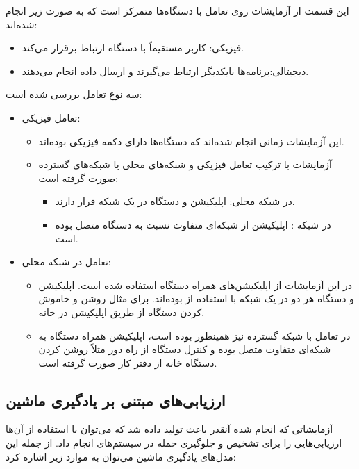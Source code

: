 این قسمت از آزمایشات روی تعامل با دستگاه‌ها متمرکز است که به صورت زیر انجام
شده‌اند:

\begin{itemize}
    \item فیزیکی: کاربر مستقیماً با دستگاه ارتباط برقرار می‌کند.
    \item دیجیتالی:‌برنامه‌ها بایکدیگر ارتباط می‌گیرند و ارسال داده انجام
    می‌دهند.
\end{itemize}

سه نوع تعامل بررسی شده است:

\begin{itemize}
    \item تعامل فیزیکی:
    \begin{itemize}
        \item این آزمایشات زمانی انجام شده‌اند که دستگاه‌ها دارای دکمه فیزیکی
        بوده‌اند.
        \item آزمایشات با ترکیب تعامل فیزیکی و شبکه‌های محلی یا شبکه‌های گسترده
        صورت گرفته است:
        \begin{itemize}
            \item در شبکه محلی: اپلیکیشن و دستگاه در یک شبکه قرار دارند.
            \item در شبکه : اپلیکیشن از شبکه‌ای متفاوت نسبت به دستگاه
            متصل بوده است.
        \end{itemize}
    \end{itemize}
    \item تعامل در شبکه محلی:
    \begin{itemize}
        \item در این آزمایشات از اپلیکیشن‌های همراه دستگاه استفاده شده است.
        اپلیکیشن و دستگاه هر دو در یک شبکه با استفاده از  بوده‌اند.
        برای مثال روشن و خاموش کردن دستگاه از طریق اپلیکیشن در خانه.
        \item در تعامل با شبکه گسترده نیز همینطور بوده است، اپلیکیشن همراه
        دستگاه به شبکه‌ای متفاوت متصل بوده و کنترل دستگاه از راه دور مثلاً روشن
        کردن دستگاه خانه از دفتر کار صورت گرفته است.
    \end{itemize}
\end{itemize}

\subsection{ارزیابی‌های مبتنی بر یادگیری ماشین}

آزمایشاتی که انجام شده آنقدر باعث تولید داده شد که می‌توان با استفاده از آن‌ها
ارزیابی‌هایی را برای تشخیص و جلوگیری حمله در سیستم‌های  انجام داد. از
جمله این مدل‌های یادگیری ماشین می‌توان به موارد زیر اشاره کرد:

